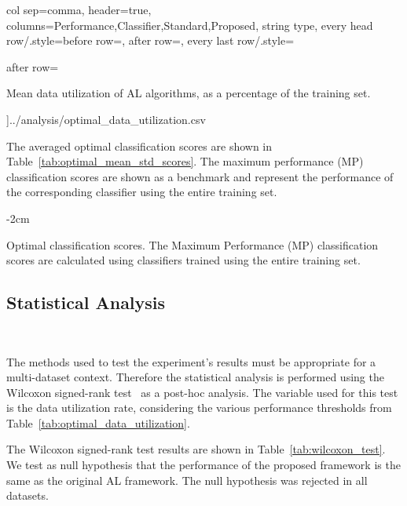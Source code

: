 \documentclass[remotesensing,article,submit,moreauthors,pdftex]{Definitions/mdpi}
\begin{document}
	col sep=comma,
	header=true,
    columns={Performance,Classifier,Standard,Proposed}, 
    string type,
    every head row/.style={before row=\toprule, after row=\midrule\endhead},
	every last row/.style={
        after row={
            \bottomrule
            \caption{
                Mean data utilization of AL algorithms, as a percentage of the training set.
            }\label{tab:optimal_data_utilization}
        }
    }
]{../analysis/optimal_data_utilization.csv}
\begin{paracol}{2}
\linenumbers
\switchcolumn



The averaged optimal classification scores are shown in
Table~\ref{tab:optimal_mean_std_scores}. The maximum performance (MP)
classification scores are shown as a benchmark and represent the performance
of the corresponding classifier using the entire training set. 

\begin{table}[htb]
    \centering
    \addtolength{\leftskip} {-2cm}
    \addtolength{\rightskip}{-2cm}
    \caption{\label{tab:optimal_mean_std_scores}
        Optimal classification scores. The Maximum Performance (MP)
        classification scores are calculated using classifiers trained using
        the entire training set.
    }
\end{table}

\subsection{Statistical Analysis}~\label{sec:statistical-analysis}

The methods used to test the experiment's results must be appropriate for a
multi-dataset context. Therefore the statistical analysis is performed using
the Wilcoxon signed-rank
test~\cite{Wilcoxon1945} as a post-hoc analysis. The variable used for this
test is the data utilization rate, considering the various performance
thresholds from Table~\ref{tab:optimal_data_utilization}.

The Wilcoxon signed-rank test results are shown in
Table~\ref{tab:wilcoxon_test}. We test as null hypothesis that the performance
of the proposed framework is the same as the original AL framework. The null
hypothesis was rejected in all datasets.


\end{paracol}
\end{document}
